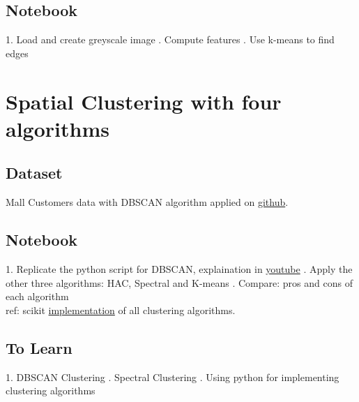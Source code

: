 \documentclass{article}
\begin{document}
\subsection*{Notebook}
1. Load and create greyscale image
. Compute features
. Use k-means to find edges
\section*{Spatial Clustering with four algorithms}
\subsection*{Dataset} Mall Customers data with DBSCAN algorithm applied on \href{https://github.com/krishnaik06/DBSCAN-Algorithm}{github}.

\subsection*{Notebook}
1. Replicate the python script for DBSCAN, explaination in \href{https://www.youtube.com/watch?v=C3r7tGRe2eI}{youtube}
. Apply the other three algorithms: HAC, Spectral and K-means
. Compare: pros and cons of each algorithm\\ ref: scikit \href{https://scikit-learn.org/stable/auto_examples/cluster/plot_cluster_comparison.html#sphx-glr-auto-examples-cluster-plot-cluster-comparison-py}{implementation} of all clustering algorithms.
\subsection*{To Learn}
1. DBSCAN Clustering
. Spectral Clustering
. Using python for implementing clustering algorithms
\end{document}
